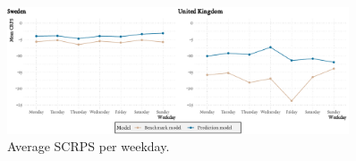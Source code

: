 \begin{figure}
    \centering
    \includegraphics[width=0.9\textwidth]{plots/CRPS_over_weekdays}
    \caption{Average SCRPS per weekday.}
    \label{fig:SCRPS_weekdays}
\end{figure}